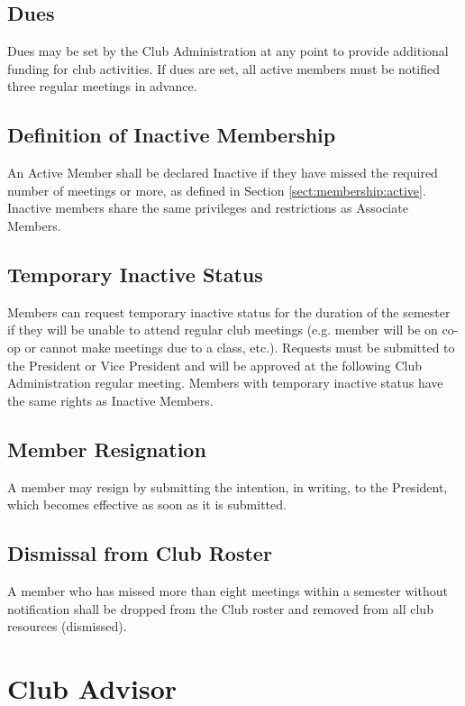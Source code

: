 \documentclass[english,11pt]{article}
\begin{document}
\subsection{Dues} \label{sect:membership:dues}
Dues may be set by the Club Administration at any point to provide additional funding for club activities.
If dues are set, all active members must be notified three regular meetings in advance.

\subsection{Definition of Inactive Membership} \label{sect:membership:inactive}
An Active Member shall be declared Inactive if they have missed the required number of meetings or more, as defined in Section \ref{sect:membership:active}.
Inactive members share the same privileges and restrictions as Associate Members.

\subsection{Temporary Inactive Status} \label{sect:membership:tmp-inactive}
Members can request temporary inactive status for the duration of the semester if they will be unable to attend regular club meetings (e.g. member will be on co-op or cannot make meetings due to a class, etc.).
Requests must be submitted to the President or Vice President and will be approved at the following Club Administration regular meeting.
Members with temporary inactive status have the same rights as Inactive Members.

\subsection{Member Resignation} \label{sect:membership:resignation}
A member may resign by submitting the intention, in writing, to the President, which becomes effective as soon as it is submitted.

\subsection{Dismissal from Club Roster} \label{sect:membership:dismissal}
A member who has missed more than eight meetings within a semester without notification shall be dropped from the Club roster and removed from all club resources (dismissed).

\section{Club Advisor} \label{art:advisor}
\end{document}
